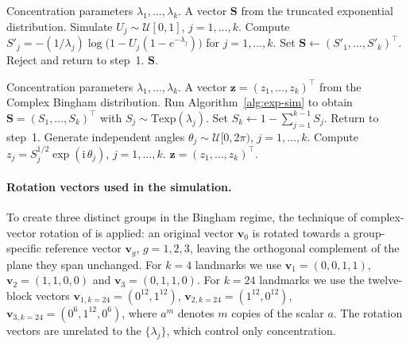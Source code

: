 \documentclass[11pt,a4paper]{article}
\newcommand{\bz}{\mathbf{z}}
\begin{document}
\begin{algorithm}[t]
\caption{Truncated-exponential generator
  \citep{kent2004simulation}.}
\label{alg:exp-sim}
\begin{algorithmic}[1]
\Require Concentration parameters $\lambda_1,\ldots,\lambda_k$.
\Ensure  A vector $\bm{S}$ from the truncated exponential distribution.
\State Simulate $U_j\sim\mathcal{U}[0,1]$, $j=1,\ldots,k$.
\State Compute $S'_j = -(1/\lambda_j)\log\bigl(1-U_j(1-e^{-\lambda_j})\bigr)$
       for $j=1,\ldots,k$.
  \State Set $\bm{S} \gets (S'_1,\ldots,S'_k)^\top$.
\Else
  \State Reject and return to step~1.
\EndIf
\State \Return $\bm{S}$.
\end{algorithmic}
\end{algorithm}

\begin{algorithm}[t]
\caption{Complex Bingham generator
  \citep{kent2004simulation}.}
\label{alg:bin-sim}
\begin{algorithmic}[1]
\Require Concentration parameters $\lambda_1,\ldots,\lambda_k$.
\Ensure  A vector $\bz=(z_1,\ldots,z_k)^\top$ from the Complex Bingham
         distribution.
\State Run Algorithm~\ref{alg:exp-sim} to obtain $\bm{S}=(S_1,\ldots,S_k)^\top$
       with $S_j\sim\text{Texp}(\lambda_j)$.
  \State Set $S_k \gets 1-\sum_{j=1}^{k-1} S_j$.
\Else
  \State Return to step~1.
\EndIf
\State Generate independent angles $\theta_j\sim\mathcal{U}[0,2\pi)$,
       $j=1,\ldots,k$.
\State Compute $z_j = S_j^{1/2}\exp(\mathrm{i}\,\theta_j)$, $j=1,\ldots,k$.
\State \Return $\bz=(z_1,\ldots,z_k)^\top$.
\end{algorithmic}
\end{algorithm}

\paragraph{Rotation vectors used in the simulation.} To create three
distinct groups in the Bingham regime, the technique of complex-vector
rotation of \citet{amaral2007pivotal} is applied: an original vector
$\mathbf{v}_0$ is rotated towards a group-specific reference vector
$\mathbf{v}_g$, $g=1,2,3$, leaving the orthogonal complement of the plane
they span unchanged. For $k=4$ landmarks we use
$\mathbf{v}_{1}=(0,0,1,1)$, $\mathbf{v}_{2}=(1,1,0,0)$ and
$\mathbf{v}_{3}=(0,1,1,0)$. For $k=24$ landmarks we use the
twelve-block vectors
$\mathbf{v}_{1,k=24}=(0^{12},1^{12})$,
$\mathbf{v}_{2,k=24}=(1^{12},0^{12})$,
$\mathbf{v}_{3,k=24}=(0^{6},1^{12},0^{6})$,
where $a^{m}$ denotes $m$ copies of the scalar $a$. The rotation vectors
are unrelated to the $\{\lambda_j\}$, which control only concentration.
\end{document}
